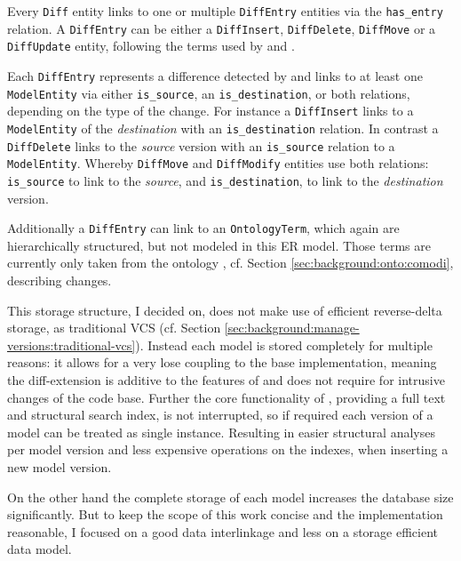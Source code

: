 Every \texttt{Diff} entity links to one or multiple \texttt{DiffEntry} entities via the \texttt{has\_entry} relation.  
A \texttt{DiffEntry} can be either a \texttt{DiffInsert},  \texttt{DiffDelete}, \texttt{DiffMove} or a \texttt{DiffUpdate} entity, following the terms used by \bives \citep{Scharm2015} and \comodi \citep{Scharm2016}.

Each \texttt{DiffEntry} represents a difference detected by \bives \citep{Scharm2015} and links to at least one \texttt{ModelEntity} via either \texttt{is\_source}, an \texttt{is\_destination}, or both relations, depending on the type of the change.
For instance a \texttt{DiffInsert} links to a \texttt{ModelEntity} of the \emph{destination} with an \texttt{is\_destination} relation.
In contrast a \texttt{DiffDelete} links to the \emph{source} version with an \texttt{is\_source} relation to a \texttt{ModelEntity}. Whereby \texttt{DiffMove} and \texttt{DiffModify} entities use both relations: \texttt{is\_source} to link to the \emph{source}, and \texttt{is\_destination}, to link to the \emph{destination} version.

Additionally a \texttt{DiffEntry} can link to an \texttt{OntologyTerm}, which again are hierarchically structured, but not modeled in this ER model. Those terms are currently only taken from the \comodi ontology \citep{Scharm2016}, cf. Section \ref{sec:background:onto:comodi}, describing changes.


This storage structure, I decided on, does not make use of efficient reverse-delta storage, as traditional VCS (cf. Section \ref{sec:background:manage-versions:traditional-vcs}). Instead each model is stored completely for multiple reasons: it allows for a very lose coupling to the base \masymos implementation, meaning the diff-extension is additive to the features of \masymos and does not require for intrusive changes of the code base. Further the core functionality of \masymos, providing a full text and structural search index, is not interrupted, so if required each version of a model can be treated as single instance. Resulting in easier structural analyses per model version and less expensive operations on the indexes, when inserting a new model version.

On the other hand the complete storage of each model increases the database size significantly. But to keep the scope of this work concise and the implementation reasonable, I focused on a good data interlinkage and less on a storage efficient data model. 

